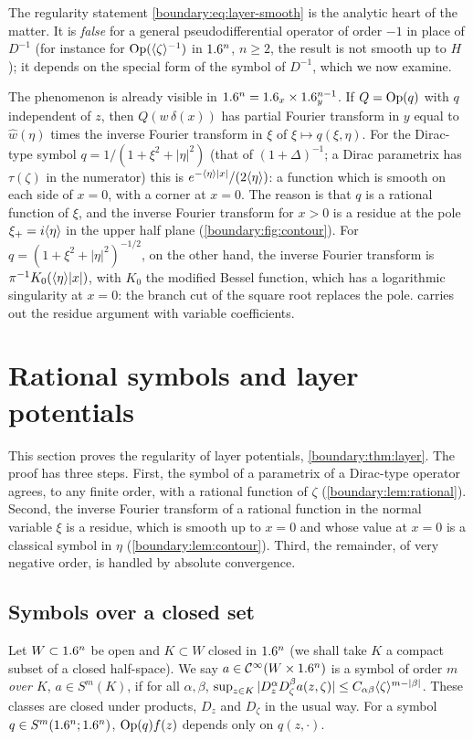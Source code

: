 The regularity statement \eqref{boundary:eq:layer-smooth} is the analytic heart of the
matter. It is \emph{false} for a general pseudodifferential operator of order $-1$ in
place of $D^{-1}$ (for instance for $\operatorname{Op}(\langle \zeta\rangle^{-1})$ in $1.6^n$, $n\ge2$, the
result is not smooth up to $H$); it depends on the special form of the symbol of
$D^{-1}$, which we now examine.

\begin{discussion}
The phenomenon is already visible in $1.6^n=1.6_x\times1.6^{n-1}_y$. If $Q=\operatorname{Op}(q)$ with
$q$ independent of $z$, then $Q(w\,\delta(x))$ has partial Fourier transform in $y$
equal to $\hat w(\eta)$ times the inverse Fourier transform in $\xi$ of
$\xi\mapsto q(\xi,\eta)$. For the Dirac-type symbol $q=1/(1+\xi^2+|\eta|^2)$ (that of
$(1+\Delta)^{-1}$; a Dirac parametrix has $\tau(\zeta)$ in the numerator) this is
$e^{-\langle \eta\rangle|x|}/(2\langle \eta\rangle)$: a function which is smooth on each side of $x=0$,
with a corner at $x=0$. The reason is that $q$ is a rational function of $\xi$, and
the inverse Fourier transform for $x>0$ is a residue at the pole $\xi_+=i\langle \eta\rangle$ in
the upper half plane (\cref{boundary:fig:contour}). For $q=(1+\xi^2+|\eta|^2)^{-1/2}$,
on the other hand, the inverse Fourier transform is $\pi^{-1}K_0(\langle \eta\rangle|x|)$, with
$K_0$ the modified Bessel function, which has a logarithmic singularity at $x=0$:
the branch cut of the square root replaces the pole. 
carries out the residue argument with variable coefficients.
\end{discussion}

\section{Rational symbols and layer potentials}\label{boundary:sec:rational}

This section proves the regularity of layer potentials, \cref{boundary:thm:layer}.
The proof has three steps. First, the symbol of a parametrix of a Dirac-type
operator agrees, to any finite order, with a rational function of $\zeta$
(\cref{boundary:lem:rational}). Second, the inverse Fourier transform of a rational
function in the normal variable $\xi$ is a residue, which is smooth up to $x=0$ and
whose value at $x=0$ is a classical symbol in $\eta$ (\cref{boundary:lem:contour}).
Third, the remainder, of very negative order, is handled by absolute convergence.

\subsection*{Symbols over a closed set}
Let $W\subset1.6^n$ be open and $K\subset W$ closed in $1.6^n$ (we shall take $K$ a
compact subset of a closed half-space). We say $a\in\mathcal{C}^\infty(W\times1.6^n)$ is a symbol of
order $m$ \emph{over $K$}, $a\in S^m(K)$, if for all $\alpha,\beta$,
$\sup_{z\in K}|D_z^\alpha D_\zeta^\beta a(z,\zeta)|\le C_{\alpha\beta}\langle \zeta\rangle^{m-|\beta|}$.
These classes are closed under products, $D_z$ and $D_\zeta$ in the usual way. For a
symbol $q\in S^m(1.6^n;1.6^n)$, $\operatorname{Op}(q)f(z)$ depends only on $q(z,\cdot)$.

